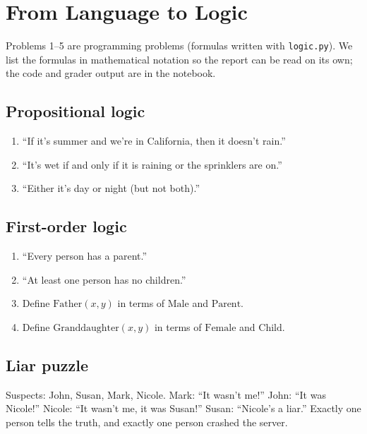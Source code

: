 \section{From Language to Logic}
\label{sec:logic}

Problems 1--5 are programming problems (formulas written with \texttt{logic.py}). We list the formulas in
mathematical notation so the report can be read on its own; the code and grader output are in the notebook.

\subsection{Propositional logic}
\begin{enumerate}[label=(1\alph*)]
  \item ``If it's summer and we're in California, then it doesn't rain.'' \quad {}
  \item ``It's wet if and only if it is raining or the sprinklers are on.'' \quad {}
  \item ``Either it's day or night (but not both).'' \quad {}
\end{enumerate}

\subsection{First-order logic}
\begin{enumerate}[label=(2\alph*)]
  \item ``Every person has a parent.'' \quad {}
  \item ``At least one person has no children.'' \quad {}
  \item Define $\text{Father}(x,y)$ in terms of $\text{Male}$ and $\text{Parent}$. \quad {}
  \item Define $\text{Granddaughter}(x,y)$ in terms of $\text{Female}$ and $\text{Child}$. \quad {}
\end{enumerate}

\subsection{Liar puzzle}
Suspects: John, Susan, Mark, Nicole. Mark: ``It wasn't me!'' John: ``It was Nicole!'' Nicole: ``It wasn't me, it
was Susan!'' Susan: ``Nicole's a liar.'' Exactly one person tells the truth, and exactly one person crashed the server.


